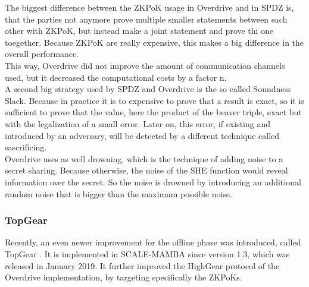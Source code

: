 \documentclass[english,runningheads,a4paper]{llncs}[2018/03/10]
\begin{document}
The biggest difference between the ZKPoK usage in Overdrive and in SPDZ is, that the parties not anymore prove multiple smaller statements between each other with ZKPoK, but instead make a joint statement and prove thi one toegether. Because ZKPoK are really expensive, this makes a big difference in the overall performance.\\
This way, Overdrive did not improve the amount of communication channels used, but it decreased the computational costs by a factor n.\\
A second big strategy used by SPDZ and Overdrive is the so called Soundness Slack. Because in practice it is to expensive to prove that a result is exact, so it is sufficient to prove that the value, here the product of the beaver triple, exact but with the legalization of a small error. Later on, this error, if existing and introduced by an adversary, will be detected by a different technique called sascrificing.\\
Overdrive uses as well drowning, which is the technique of adding noise to a secret sharing. Because otherwise, the noise of the SHE function would reveal information over the secret. So the noise is drowned by introducing an additional random noise that is bigger than the maximum possible noise.\\


\subsubsection{TopGear}
Recently, an even newer improvement for the offline phase was introduced, called TopGear \cite{cryptoeprint:2019:035}. It is implemented in SCALE-MAMBA since version 1.3\cite{ScaleMambaDocu}, which was released in January 2019. It further improved the HighGear protocol of the Overdrive implementation, by targeting specifically the ZKPoKs.
\end{document}
